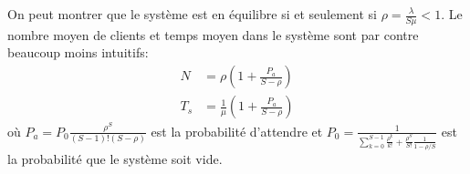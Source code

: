     On peut montrer que le système est en équilibre si et seulement si
    $\rho = \frac \lambda {S\mu} < 1$. Le nombre moyen de clients et temps
    moyen dans le système sont par contre beaucoup moins intuitifs:
    \[
      \begin{aligned}
        N   &= \rho \left(1 + \frac{P_a}{S-\rho}\right) \\
        T_s &= \frac{1}{\mu} \left(1 + \frac{P_a}{S-\rho}\right)
      \end{aligned}
    \]
    où $\displaystyle P_a = P_0 \frac{\rho^S}{(S-1)!(S-\rho)}$ est la
    probabilité d'attendre et $\displaystyle P_0 = \frac{1}{\sum_{k=0}^{S-1}
    \frac{\rho^k}{k!} + \frac {\rho^S}{S!} \frac {1}{1-\rho/S} }$ est la
    probabilité que le système soit vide.

